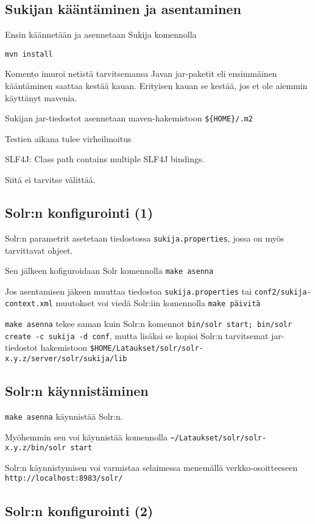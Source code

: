 \documentclass[12pt]{article}
\begin{document}
\subsection*{Sukijan kääntäminen ja asentaminen}

Ensin käännetään ja asennetaan Sukija komennolla

\verb=mvn install=

Komento imuroi netistä tarvitsemansa Javan jar-paketit eli ensimmäinen
kääntäminen saattaa kestää kauan. Erityisen kauan se kestää, jos et
ole aiemmin käyttänyt mavenia.

Sukijan jar-tiedostot asennetaan maven-hakemistoon \verb|${HOME}/.m2|

Testien aikana tulee virheilmoitus

SLF4J: Class path contains multiple SLF4J bindings.

Siitä ei tarvitse välittää.


\subsection*{Solr:n konfigurointi (1)}

Solr:n parametrit asetetaan tiedostossa \verb|sukija.properties|,
jossa on myös tarvittavat ohjeet.

Sen jälkeen kofiguroidaan Solr komennolla \verb|make asenna|

Jos asentamisen jäkeen muuttaa tiedostoa
\verb|sukija.properties| tai
\verb|conf2/sukija-context.xml|
muutokset voi viedä Solr:iin komennolla \verb|make päivitä|

\verb=make asenna= tekee saman kuin Solr:n komennot
\verb=bin/solr start; bin/solr create -c sukija -d conf=, mutta lisäksi se
kopioi Solr:n tarvitsemat jar-tiedostot hakemistoon
\verb=$HOME/Lataukset/solr/solr-x.y.z/server/solr/sukija/lib=


\subsection*{Solr:n käynnistäminen}

\verb|make asenna| käynnistää Solr:n.

Myöhemmin sen voi käynnistää komennolla
\verb|~/Lataukset/solr/solr-x.y.z/bin/solr start|


Solr:n käynnistymisen voi varmistaa selaimessa menemällä
verkko-osoitteeseen
\verb|http://localhost:8983/solr/|


\subsection*{Solr:n konfigurointi (2)}
\end{document}
